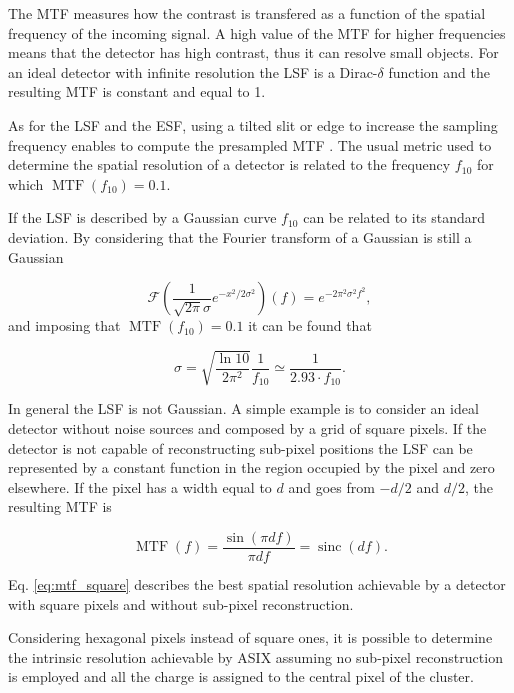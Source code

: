 The MTF measures how the contrast is transfered as a function of the spatial frequency of the incoming signal. A high value of the MTF for higher frequencies means that the detector has high contrast, thus it can resolve small objects. For an ideal detector with infinite resolution the LSF is a Dirac-$\delta$ function and the resulting MTF is constant and equal to 1.

As for the LSF and the ESF, using a tilted slit or edge to increase the sampling frequency enables to compute the presampled MTF \cite{samei1998}. The usual metric used to determine the spatial resolution of a detector is related to the frequency $f_{10}$ for which $\operatorname{MTF}(f_{10}) = 0.1$.

If the LSF is described by a Gaussian curve $f_{10}$ can be related to its standard deviation. By considering that the Fourier transform of a Gaussian is still a Gaussian

\begin{equation}
\mathcal{F} \left( \frac{1}{\sqrt{2 \pi}\sigma} e^{-x^2/2\sigma^2 } \right) (f) = e^{-2 \pi^2 \sigma^2 f^2},
\label{eq:mtf_gauss}
\end{equation}
and imposing that $\operatorname{MTF}(f_{10}) = 0.1$ it can be found that

\begin{equation}
\sigma = \sqrt{\frac{\ln 10}{2 \pi^2}} \frac{1}{f_{10}} \simeq \frac{1}{2.93 \cdot f_{10}}.
\label{eq:mtf_sigma}
\end{equation}

In general the LSF is not Gaussian. A simple example is to consider an ideal detector without noise sources and composed by a grid of square pixels. If the detector is not capable of reconstructing sub-pixel positions the LSF can be represented by a constant function in the region occupied by the pixel and zero elsewhere. If the pixel has a width equal to $d$ and goes from $-d/2$ and $d/2$, the resulting MTF is \cite{med_imaging}

\begin{equation}
\operatorname{MTF}(f) = \frac{\sin (\pi d f)}{\pi df} = \operatorname{sinc}(df).
\label{eq:mtf_square}
\end{equation}

Eq. \ref{eq:mtf_square} describes the best spatial resolution achievable by a detector with square pixels and without sub-pixel reconstruction.

Considering hexagonal pixels instead of square ones, it is possible to determine the intrinsic resolution achievable by ASIX assuming no sub-pixel reconstruction is employed and all the charge is assigned to the central pixel of the cluster.

